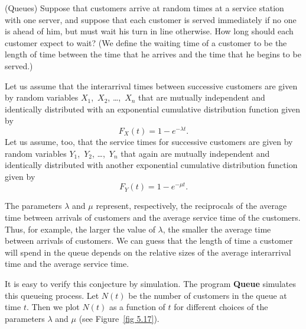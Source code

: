 \begin{example}(Queues)\label{exam 5.21} Suppose that customers arrive at random
times at a service station with one server, and suppose that each customer is served immediately if
no one is ahead of him, but must wait his turn in line otherwise.  How long should each
customer expect to wait?  (We define the waiting time of a customer to be the length of 
time between the time that he arrives and the time that he begins to be served.) 
\par
Let us assume that the interarrival times between successive customers are given by random
variables $X_1$,~$X_2$, \dots,~$X_n$ that are mutually independent and identically distributed
with an exponential cumulative distribution function given by
$$ F_X(t) = 1 - e^{-\lambda t}.
$$ 
Let us assume, too, that the service
times for successive customers are given by random variables
$Y_1$,~$Y_2$, \dots,~$Y_n$ that again are mutually independent and identically distributed
with another exponential cumulative distribution function given by
$$ F_Y(t) = 1 - e^{-\mu t}.
$$ 
\par
The parameters $\lambda$ and $\mu$ represent, respectively, the reciprocals of the average time
between arrivals of customers and the average service
time of the customers.  Thus, for example, the larger the value of
$\lambda$, the smaller the average time between arrivals of customers.  We can guess that the length of time
a customer will spend in the queue depends on the relative sizes of the average interarrival time
and the average service time.
\par
It is easy to verify this conjecture by simulation.  The program {\bf Queue} simulates this queueing process.  Let $N(t)$ be the number of customers in the queue at
time $t$.  Then we plot $N(t)$ as a function of $t$ for different choices of the parameters
$\lambda$ and
$\mu$ (see Figure~\ref{fig 5.17}).



\end{example}
